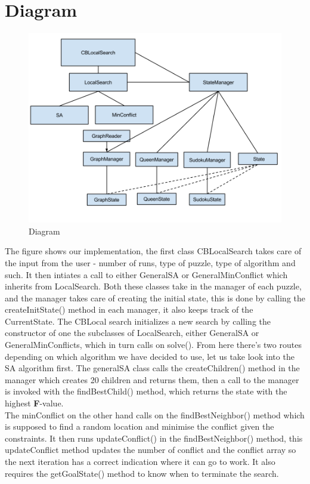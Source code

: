 \documentclass[12pt, a4paper]{article}
\begin{document}
\section{Diagram}
\begin{figure}[H] \includegraphics[width=15cm]{2_Diagram}

\caption{Diagram}
\label{diagram}
\end{figure}
The figure shows our implementation, the first class CBLocalSearch takes care of the input from the user - number of runs, type of puzzle, type of algorithm and such. It then intiates a
call to either GeneralSA or GeneralMinConflict which inherits from LocalSearch. Both these classes take in the manager of each puzzle, and the manager takes care of creating the initial state, this is done by calling the createInitState() method in each manager, it also keeps track of the CurrentState.
The CBLocal search initializes a new search by calling the constructor of one the subclasses of LocalSearch, either GeneralSA or GeneralMinConflicts, which in turn calls on solve(). From here there's two routes depending on which algorithm we have decided to use, let us take look into the SA algorithm first. The generalSA class calls the createChildren() method in the manager which creates 20 children and returns them, then a call to the manager is invoked with the findBestChild() method, which returns the state with the highest \textbf{F}-value. \\
The minConflict on the other hand calls on the findBestNeighbor() method which is supposed to find a random location and minimise the conflict given the constraints. It then runs updateConflict() in the findBestNeighbor() method, this updateConflict method updates the number of conflict and the conflict array so the next iteration has a correct indication where it can go to work. It also requires the getGoalState() method to know when to terminate the search.\\
\end{document}
